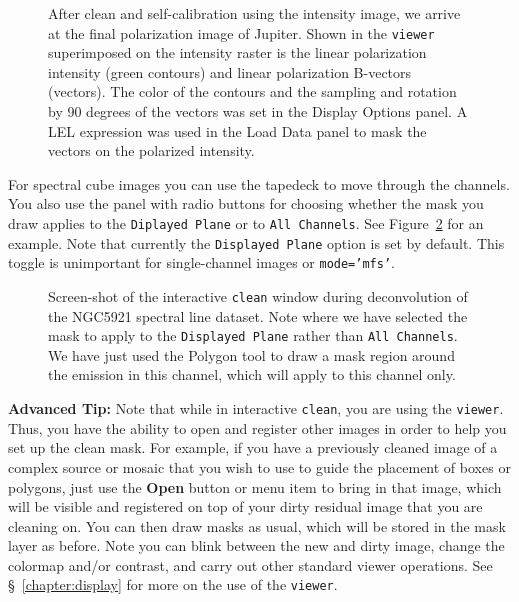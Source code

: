 \begin{figure}[h!]
\begin{center}
\caption{\label{fig:clean_polfinal} 
After clean and self-calibration using the intensity image, we 
arrive at the final polarization image of Jupiter.  Shown in
the {\tt viewer} superimposed on the intensity raster is the
linear polarization intensity (green contours) and linear polarization
B-vectors (vectors).  The color of the contours and the sampling and
rotation by 90 degrees of the vectors was set in the Display Options
panel.  A LEL expression was used in the Load Data panel to mask the
vectors on the polarized intensity.}
\hrulefill
\end{center}
\end{figure}

For spectral cube images you can use the tapedeck to move through the
channels.  You also use the panel with radio buttons for choosing
whether the mask you draw applies to the
{\tt Diplayed Plane} or to {\tt All Channels}.
See Figure~\ref{fig:clean_n5921_inter} for an example.  Note that
currently the {\tt Displayed Plane} option is set by default.  
This toggle is unimportant for single-channel images or {\tt mode='mfs'}.

\begin{figure}[h!]
\begin{center}
\caption{\label{fig:clean_n5921_inter} Screen-shot of the interactive 
{\tt clean} window during deconvolution of the NGC5921 spectral
line dataset.  Note where we have selected
the mask to apply to the {\tt Displayed Plane} rather than
{\tt All Channels}.  We have just used the
Polygon tool to draw a mask region around the emission in this
channel, which will apply to this channel only. } 
\hrulefill
\end{center}
\end{figure}

{\bf Advanced Tip:} Note that while in interactive {\tt clean}, you
are using the {\tt viewer}. Thus, you have the ability to open and
register other images in order to help you set up the clean mask.
For example, if you have a previously cleaned image of a complex
source or mosaic that you wish to use to guide the placement of boxes
or polygons, just use the {\bf Open} button or menu item to bring in
that image, which will be visible and registered on top of your dirty
residual image that you are cleaning on.  You can then draw masks as
usual, which will be stored in the mask layer as before.  Note you can
blink between the new and dirty image, change the colormap and/or
contrast, and carry out other standard viewer operations.  See
\S~\ref{chapter:display} for more on the use of the {\tt viewer}.

